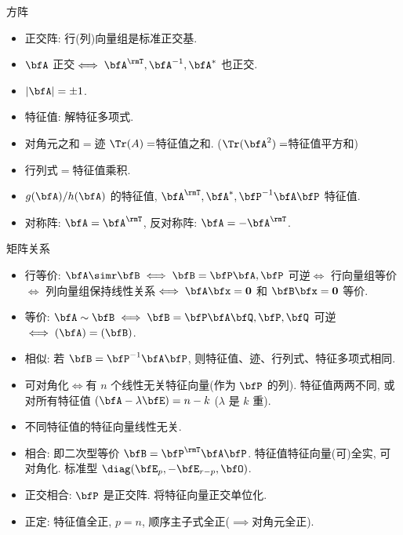 \documentclass[aspectratio=169,handout]{ctexbeamer}
\let\rank\relax\DeclareMathOperator\rank{R}
\begin{document}
\begin{frame}{方阵}
	\onslide<+->
	\begin{itemize}
		\item 正交阵: 行(列)向量组是标准正交基.
		\item $\bfA$ 正交$\iff\bfA^\rmT,\bfA^{-1},\bfA^*$ 也正交.
		\item $|\bfA|=\pm1$.
	\end{itemize}
	\begin{itemize}
		\item 特征值: 解特征多项式.
		\item 对角元之和$=$迹 $\Tr(A)=$特征值之和. ($\Tr(\bfA^2)=$特征值平方和)
		\item 行列式$=$特征值乘积.
		\item $g(\bfA)/h(\bfA)$ 的特征值, $\bfA^\rmT,\bfA^*,\bfP^{-1}\bfA\bfP$ 特征值.
	\end{itemize}
	\begin{itemize}
		\item 对称阵: $\bfA=\bfA^\rmT$, 反对称阵: $\bfA=-\bfA^\rmT$.
	\end{itemize}
\end{frame}



\begin{frame}{矩阵关系}
	\onslide<+->
	\begin{itemize}
		\item 行等价: $\bfA\simr\bfB\iff \bfB=\bfP\bfA,\bfP$ 可逆$\iff$ 行向量组等价$\iff$ 列向量组保持线性关系$\iff\bfA\bfx={\bf0}$ 和 $\bfB\bfx={\bf0}$ 等价.
		\item 等价: $\bfA\sim\bfB\iff \bfB=\bfP\bfA\bfQ,\bfP,\bfQ$ 可逆$\iff \rank(\bfA)=\rank(\bfB)$.
	\end{itemize}
	\begin{itemize}
		\item 相似: 若 $\bfB=\bfP^{-1}\bfA\bfP$, 则特征值、迹、行列式、特征多项式相同.
		\item 可对角化$\iff$有 $n$ 个线性无关特征向量(作为 $\bfP$ 的列). 特征值两两不同, 或对所有特征值 $\rank(\bfA-\lambda\bfE)=n-k$ ($\lambda$ 是 $k$ 重).
		\item 不同特征值的特征向量线性无关.
	\end{itemize}
	\begin{itemize}
		\item 相合: 即二次型等价 $\bfB=\bfP^\rmT\bfA\bfP$. 特征值特征向量(可)全实, 可对角化. 标准型 $\diag(\bfE_p,-\bfE_{r-p},\bfO)$.
		\item 正交相合: $\bfP$ 是正交阵. 将特征向量正交单位化.
		\item 正定: 特征值全正, $p=n$, 顺序主子式全正($\implies$对角元全正).
	\end{itemize}
\end{frame}
\end{document}
